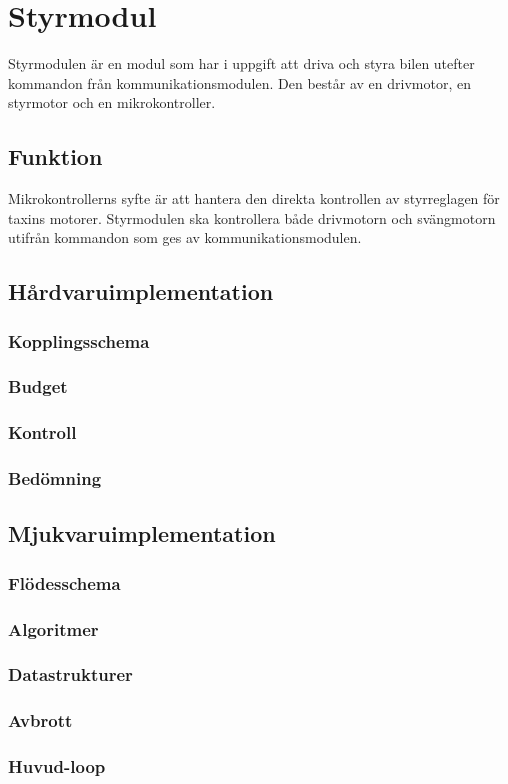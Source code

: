 \documentclass[designspec/spec.tex]{subfiles}
\begin{document}
\section{Styrmodul}
Styrmodulen är en modul som har i uppgift att driva och styra bilen utefter
kommandon från kommunikationsmodulen. Den består av en drivmotor, en styrmotor
och en mikrokontroller.

\subsection{Funktion}
Mikrokontrollerns syfte är att hantera den direkta kontrollen av styrreglagen
för taxins motorer. Styrmodulen ska kontrollera både drivmotorn och svängmotorn
utifrån kommandon som ges av kommunikationsmodulen.

\subsection{Hårdvaruimplementation}

\subsubsection{Kopplingsschema}

\subsubsection{Budget}

\subsubsection{Kontroll}

\subsubsection{Bedömning}

\subsection{Mjukvaruimplementation}

\subsubsection{Flödesschema}

\subsubsection{Algoritmer}

\subsubsection{Datastrukturer}

\subsubsection{Avbrott}

\subsubsection{Huvud-loop}
\end{document}
